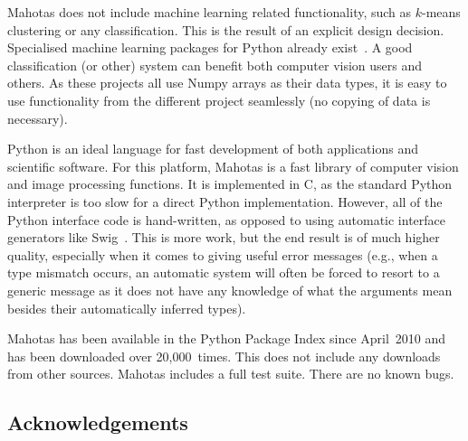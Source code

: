 \documentclass{scrartcl}
\newcommand*{\cpp}{{C\nolinebreak[4]\hspace{-.05em}\raisebox{.4ex}{\tiny\textbf{++}}}}
\begin{document}
Mahotas does not include machine learning related functionality, such as
$k$-means clustering or any classification. This is the result of an explicit
design decision. Specialised machine learning packages for Python already
exist~\citep{Pedregosa:2011:SML:2078183.2078195,springerlink:10.1007/978-3-540-30116-5_58,Schaul:2010:PYB:1756006.1756030,Sonnenburg:2010:SML:1756006.1859911}.
A good classification (or other) system can benefit both computer vision users
and others. As these projects all use Numpy arrays as their data types, it is
easy to use functionality from the different project seamlessly (no copying of
data is necessary).

Python is an ideal language for fast development of both applications and
scientific software. For this platform, Mahotas is a fast library of computer
vision and image processing functions. It is implemented in \cpp{}, as the
standard Python interpreter is too slow for a direct Python implementation.
However, all of the Python interface code is hand-written, as opposed to using
automatic interface generators like Swig~\citep{Beazley2003599}. This is more
work, but the end result is of much higher quality, especially when it comes to
giving useful error messages (e.g., when a type mismatch occurs, an automatic
system will often be forced to resort to a generic message as it does not have
any knowledge of what the arguments mean besides their automatically inferred
types).

Mahotas has been available in the Python Package Index since April~2010 and has
been downloaded over 20,000~times. This does not include any downloads from
other sources. Mahotas includes a full test suite. There are no known bugs.

\subsection*{Acknowledgements}
\end{document}
